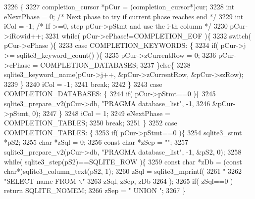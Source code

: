 \begin{DoxyCode}
3226                                                    \{
3227   completion_cursor *pCur = (completion_cursor*)cur;
3228   \textcolor{keywordtype}{int} eNextPhase = 0;  \textcolor{comment}{/* Next phase to try if current phase reaches end */}
3229   \textcolor{keywordtype}{int} iCol = -1;       \textcolor{comment}{/* If >=0, step pCur->pStmt and use the i-th column */}
3230   pCur->iRowid++;
3231   \textcolor{keywordflow}{while}( pCur->ePhase!=COMPLETION_EOF )\{
3232     \textcolor{keywordflow}{switch}( pCur->ePhase )\{
3233       \textcolor{keywordflow}{case} COMPLETION_KEYWORDS: \{
3234         \textcolor{keywordflow}{if}( pCur->j >= sqlite3_keyword_count() )\{
3235           pCur->zCurrentRow = 0;
3236           pCur->ePhase = COMPLETION_DATABASES;
3237         \}\textcolor{keywordflow}{else}\{
3238           sqlite3_keyword_name(pCur->j++, &pCur->zCurrentRow, &pCur->szRow);
3239         \}
3240         iCol = -1;
3241         \textcolor{keywordflow}{break};
3242       \}
3243       \textcolor{keywordflow}{case} COMPLETION_DATABASES: \{
3244         \textcolor{keywordflow}{if}( pCur->pStmt==0 )\{
3245           sqlite3_prepare_v2(pCur->db, \textcolor{stringliteral}{"PRAGMA database\_list"}, -1,
3246                              &pCur->pStmt, 0);
3247         \}
3248         iCol = 1;
3249         eNextPhase = COMPLETION_TABLES;
3250         \textcolor{keywordflow}{break};
3251       \}
3252       \textcolor{keywordflow}{case} COMPLETION_TABLES: \{
3253         \textcolor{keywordflow}{if}( pCur->pStmt==0 )\{
3254           sqlite3_stmt *pS2;
3255           \textcolor{keywordtype}{char} *zSql = 0;
3256           \textcolor{keyword}{const} \textcolor{keywordtype}{char} *zSep = \textcolor{stringliteral}{""};
3257           sqlite3_prepare_v2(pCur->db, \textcolor{stringliteral}{"PRAGMA database\_list"}, -1, &pS2, 0);
3258           \textcolor{keywordflow}{while}( sqlite3_step(pS2)==SQLITE_ROW )\{
3259             \textcolor{keyword}{const} \textcolor{keywordtype}{char} *zDb = (\textcolor{keyword}{const} \textcolor{keywordtype}{char}*)sqlite3_column_text(pS2, 1);
3260             zSql = sqlite3_mprintf(
3261                \textcolor{stringliteral}{"%
3262                \textcolor{stringliteral}{"SELECT name FROM \(\backslash\)"%
3263                zSql, zSep, zDb
3264             );
3265             \textcolor{keywordflow}{if}( zSql==0 ) \textcolor{keywordflow}{return} SQLITE_NOMEM;
3266             zSep = \textcolor{stringliteral}{" UNION "};
3267           \}
}}
\end{DoxyCode}
